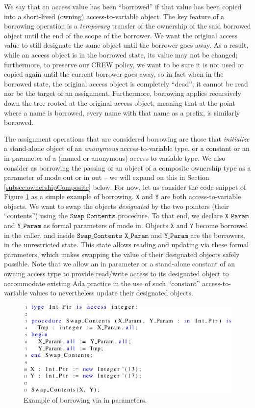 \documentclass{llncs}
\newcommand\var[1]{\ensuremath{\mathtt{#1}}}
\newcommand{\keyword}[1]{\textsf{#1}}
\begin{document}
We say that an access value has been ``borrowed'' if that value has been copied into a short-lived (owning) access-to-variable  object.
The key feature of a borrowing operation is a \textit{temporary} transfer of the ownership of the said borrowed object until the end of the scope of the borrower.
We want the original access value to still designate the same object until the borrower goes away. As a result, while an access object
is in the borrowed state, its value may not be changed; furthermore, to preserve our CREW policy, we want to be sure it is not used or copied again until the current borrower goes away, so in fact when in the borrowed state, the original access object is completely ``dead''; it cannot
be read nor be the target of an assignment. Furthermore, borrowing applies recursively down the tree rooted at the original access object, meaning that at the point where a name is borrowed,
every name with that name as a prefix, is similarly borrowed.


The assignment operations that are considered borrowing are those that \textit{initialize} a stand-alone object of an \textit{anonymous} access-to-variable type, or a \keyword{constant} or an \keyword{in} parameter of a (named or anonymous) access-to-variable
type.  We also consider as borrowing the passing of an object of a composite ownership type
as a parameter of mode \keyword{out} or \keyword{in out} -- we will expand on this in Section \ref{subsec:ownershipComposite} below. For now, let us consider the
code snippet of Figure \ref{fig:borrow_ex1} as a simple example of borrowing. \var{X} and \var{Y} are both access-to-variable objects. We want to swap the objects \textit{designated} by the two
pointers (their ``contents'') using the \var{Swap\_Contents} procedure. To that end, we declare \var{X\_Param} and \var{Y\_Param} as formal parameters of mode \keyword{in}. Objects \var{X} and \var{Y} become borrowed
in the caller, and inside \var{Swap\_Contents} \var{X\_Param} and \var{Y\_Param} are the borrowers, in the unrestricted state. This state allows reading and updating via these formal parameters, which makes swapping
the value of their designated objects safely possible. Note that we allow an \keyword{in} parameter or a stand-alone constant of an owning access type to provide read/write access to its designated object to accommodate existing Ada practice in the use of such ``constant'' access-to-variable values to nevertheless update their designated objects.

\begin{figure}[htb!]
\centering
   \includegraphics[]{borrow_ex1}
   \caption{Example of borrowing via \keyword{in} parameters.}
   \label{fig:borrow_ex1}
\end{figure}
\end{document}
